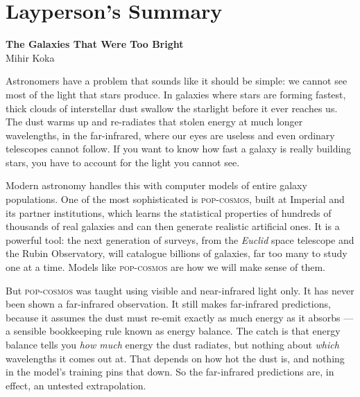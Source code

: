 \documentclass[12pt,twoside]{report}
\date{September 2026}
\begin{document}


\newpage
\section*{\centering Layperson's Summary}
\vspace{-0.3cm}
\begin{center}
{\large\bfseries The Galaxies That Were Too Bright}\\[2pt]
{\small Mihir Koka}
\end{center}

Astronomers have a problem that sounds like it should be simple: we cannot see most
of the light that stars produce. In galaxies where stars are forming fastest, thick
clouds of interstellar dust swallow the starlight before it ever reaches us. The dust
warms up and re-radiates that stolen energy at much longer wavelengths, in the
far-infrared, where our eyes are useless and even ordinary telescopes cannot follow.
If you want to know how fast a galaxy is really building stars, you have to account
for the light you cannot see.

Modern astronomy handles this with computer models of entire galaxy populations. One
of the most sophisticated is \textsc{pop-cosmos}, built at Imperial and its partner
institutions, which learns the statistical properties of hundreds of thousands of real
galaxies and can then generate realistic artificial ones. It is a powerful tool: the
next generation of surveys, from the \emph{Euclid} space telescope and the Rubin
Observatory, will catalogue billions of galaxies, far too many to study one at a time.
Models like \textsc{pop-cosmos} are how we will make sense of them.

But \textsc{pop-cosmos} was taught using visible and near-infrared light only. It has
never been shown a far-infrared observation. It still makes far-infrared predictions,
because it assumes the dust must re-emit exactly as much energy as it absorbs --- a
sensible bookkeeping rule known as energy balance. The catch is that energy balance
tells you \emph{how much} energy the dust radiates, but nothing about \emph{which}
wavelengths it comes out at. That depends on how hot the dust is, and nothing in the
model's training pins that down. So the far-infrared predictions are, in effect, an
untested extrapolation.
\end{document}
